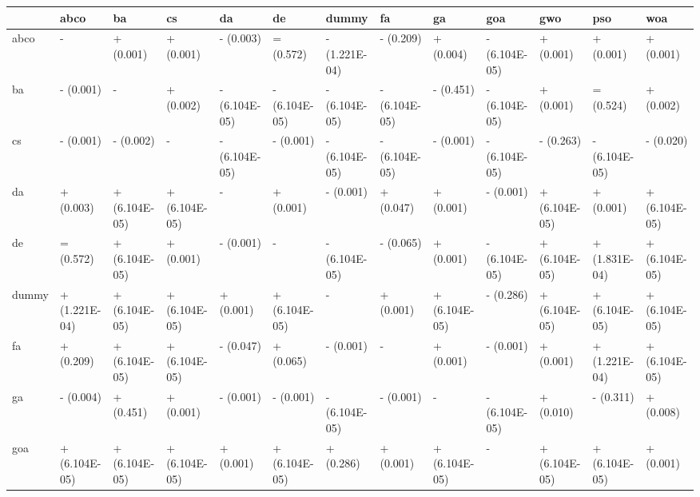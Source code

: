 \begin{table}
    \centering
    \begin{adjustbox}{width=\linewidth}
        \begin{tabular}{lllllllllllll}
            \toprule
            {}    & abco          & ba            & cs            & da            & de            & dummy         & fa            & ga            & goa           & gwo           & pso           & woa           \\
            \midrule
            abco  & -             & + (0.001)     & + (0.001)     & - (0.003)     & = (0.572)     & - (1.221E-04) & - (0.209)     & + (0.004)     & - (6.104E-05) & + (0.001)     & + (0.001)     & + (0.001)     \\
            ba    & - (0.001)     & -             & + (0.002)     & - (6.104E-05) & - (6.104E-05) & - (6.104E-05) & - (6.104E-05) & - (0.451)     & - (6.104E-05) & + (0.001)     & = (0.524)     & + (0.002)     \\
            cs    & - (0.001)     & - (0.002)     & -             & - (6.104E-05) & - (0.001)     & - (6.104E-05) & - (6.104E-05) & - (0.001)     & - (6.104E-05) & - (0.263)     & - (6.104E-05) & - (0.020)     \\
            da    & + (0.003)     & + (6.104E-05) & + (6.104E-05) & -             & + (0.001)     & - (0.001)     & + (0.047)     & + (0.001)     & - (0.001)     & + (6.104E-05) & + (0.001)     & + (6.104E-05) \\
            de    & = (0.572)     & + (6.104E-05) & + (0.001)     & - (0.001)     & -             & - (6.104E-05) & - (0.065)     & + (0.001)     & - (6.104E-05) & + (6.104E-05) & + (1.831E-04) & + (6.104E-05) \\
            dummy & + (1.221E-04) & + (6.104E-05) & + (6.104E-05) & + (0.001)     & + (6.104E-05) & -             & + (0.001)     & + (6.104E-05) & - (0.286)     & + (6.104E-05) & + (6.104E-05) & + (6.104E-05) \\
            fa    & + (0.209)     & + (6.104E-05) & + (6.104E-05) & - (0.047)     & + (0.065)     & - (0.001)     & -             & + (0.001)     & - (0.001)     & + (0.001)     & + (1.221E-04) & + (6.104E-05) \\
            ga    & - (0.004)     & + (0.451)     & + (0.001)     & - (0.001)     & - (0.001)     & - (6.104E-05) & - (0.001)     & -             & - (6.104E-05) & + (0.010)     & - (0.311)     & + (0.008)     \\
            goa   & + (6.104E-05) & + (6.104E-05) & + (6.104E-05) & + (0.001)     & + (6.104E-05) & + (0.286)     & + (0.001)     & + (6.104E-05) & -             & + (6.104E-05) & + (6.104E-05) & + (0.001)     \\

\end{tabular}
\end{adjustbox}
\end{table}
